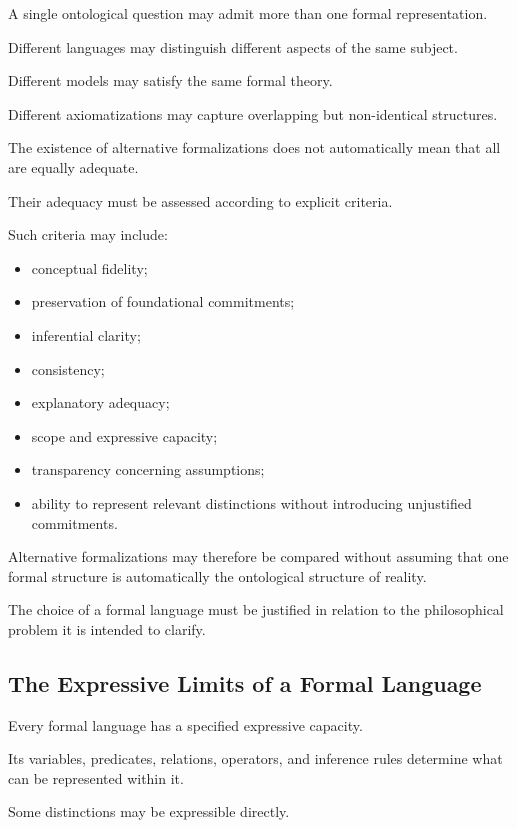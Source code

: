 A single
ontological question
may admit
more than
one formal
representation.

Different languages
may distinguish
different aspects
of the same
subject.

Different models
may satisfy
the same
formal theory.

Different axiomatizations
may capture
overlapping but
non-identical structures.

The existence
of alternative
formalizations does
not automatically
mean that
all are
equally adequate.

Their adequacy
must be
assessed according
to explicit
criteria.

Such criteria
may include:

\begin{itemize}
    \item conceptual fidelity;
    \item preservation
    of foundational
    commitments;
    \item inferential
    clarity;
    \item consistency;
    \item explanatory
    adequacy;
    \item scope
    and expressive
    capacity;
    \item transparency
    concerning
    assumptions;
    \item ability
    to represent
    relevant
    distinctions
    without
    introducing
    unjustified
    commitments.
\end{itemize}

Alternative formalizations
may therefore
be compared
without assuming
that one
formal structure
is automatically
the ontological
structure of
reality.

The choice
of a
formal language
must be
justified in
relation to
the philosophical
problem it
is intended
to clarify.

\subsection{The Expressive Limits of a Formal Language}

Every formal
language has
a specified
expressive capacity.

Its variables,
predicates,
relations,
operators,
and inference
rules determine
what can
be represented
within it.

Some distinctions
may be
expressible directly.

